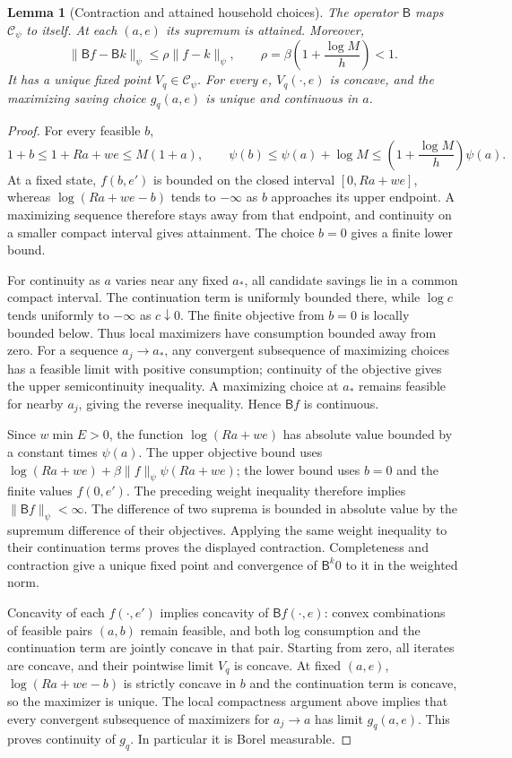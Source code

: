 \documentclass[11pt]{article}
\newtheorem{lemma}{Lemma}
\theoremstyle{definition}
\begin{document}
\begin{lemma}[Contraction and attained household choices]
The operator $\mathsf B$ maps $\mathcal C_\psi$ to itself. At each
$(a,e)$ its supremum is attained. Moreover,
\[
 \|\mathsf B f-\mathsf B k\|_\psi
 \leq\rho\|f-k\|_\psi,\qquad
 \rho=\beta\left(1+\frac{\log M}{h}\right)<1.
\]
It has a unique fixed point $V_q\in\mathcal C_\psi$.
For every $e$, $V_q(\cdot,e)$ is concave, and the maximizing saving
choice $g_q(a,e)$ is unique and continuous in $a$.
\end{lemma}
\begin{proof}
For every feasible $b$,
\[
 1+b\leq1+Ra+we\leq M(1+a),\qquad
 \psi(b)\leq\psi(a)+\log M
          \leq\left(1+\frac{\log M}{h}\right)\psi(a).
\]
At a fixed state, $f(b,e')$ is bounded on the closed interval
$[0,Ra+we]$, whereas $\log(Ra+we-b)$ tends to $-\infty$ as $b$
approaches its upper endpoint. A maximizing sequence therefore stays
away from that endpoint, and continuity on a smaller compact interval
gives attainment. The choice $b=0$ gives a finite lower bound.

For continuity as $a$ varies near any fixed $a_*$, all candidate savings
lie in a common compact interval. The continuation term is uniformly
bounded there, while $\log c$ tends uniformly to $-\infty$ as
$c\downarrow0$. The finite objective from $b=0$ is locally bounded
below. Thus local maximizers have consumption bounded away from zero.
For a sequence $a_j\to a_*$, any convergent subsequence of maximizing
choices has a feasible limit with positive consumption; continuity of
the objective gives the upper semicontinuity inequality. A maximizing
choice at $a_*$ remains feasible for nearby $a_j$, giving the reverse
inequality. Hence $\mathsf Bf$ is continuous.

Since $w\min E>0$, the function $\log(Ra+we)$ has absolute value
bounded by a constant times $\psi(a)$. The upper objective bound uses
$\log(Ra+we)+\beta\|f\|_\psi\psi(Ra+we)$; the lower bound uses
$b=0$ and the finite values $f(0,e')$. The preceding weight inequality
therefore implies $\|\mathsf Bf\|_\psi<\infty$.
The difference of two suprema is bounded in absolute value by the
supremum difference of their objectives. Applying the same weight
inequality to their continuation terms proves the displayed contraction.
Completeness and contraction give a unique fixed point and convergence
of $\mathsf B^k0$ to it in the weighted norm.

Concavity of each $f(\cdot,e')$ implies concavity of
$\mathsf Bf(\cdot,e)$: convex combinations of feasible pairs $(a,b)$
remain feasible, and both log consumption and the continuation term are
jointly concave in that pair. Starting from zero, all iterates are
concave, and their pointwise limit $V_q$ is concave. At fixed $(a,e)$,
$\log(Ra+we-b)$ is strictly concave in $b$ and the continuation term
is concave, so the maximizer is unique. The local compactness argument
above implies that every convergent subsequence of maximizers for
$a_j\to a$ has limit $g_q(a,e)$. This proves continuity of $g_q$.
In particular it is Borel measurable.
\end{proof}
\end{document}
